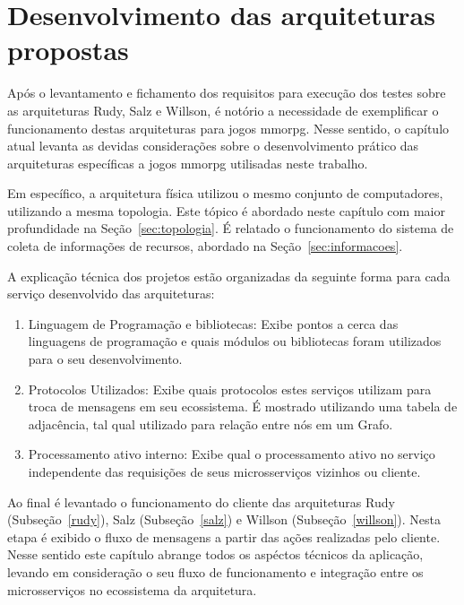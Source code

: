  
\chapter{Desenvolvimento das arquiteturas propostas}
\label{cap5}



Após o levantamento e fichamento dos requisitos para execução dos testes sobre as arquiteturas Rudy, Salz e Willson, é notório a necessidade de exemplificar o funcionamento destas arquiteturas para jogos \ac{mmorpg}.
%
Nesse sentido, o capítulo atual levanta as devidas considerações sobre o desenvolvimento prático das arquiteturas específicas a jogos \ac{mmorpg} utilisadas neste trabalho.


Em específico, a arquitetura física utilizou o mesmo conjunto de computadores, utilizando a mesma topologia.
%
Este tópico é abordado neste capítulo com maior profundidade na Seção~\ref{sec:topologia}.
%
É relatado o funcionamento do sistema de coleta de informações de recursos, abordado na Seção~\ref{sec:informacoes}.

A explicação técnica dos projetos estão organizadas da seguinte forma para cada serviço desenvolvido das arquiteturas:


\begin{enumerate}
    \item Linguagem de Programação e bibliotecas: Exibe pontos a cerca das linguagens de programação e quais módulos ou bibliotecas foram utilizados para o seu desenvolvimento.
    \item Protocolos Utilizados: Exibe quais protocolos estes serviços utilizam para troca de mensagens em seu ecossistema. É mostrado utilizando uma tabela de adjacência, tal qual utilizado para relação entre nós em um Grafo. 
    \item Processamento ativo interno: Exibe qual o processamento ativo no serviço independente das requisições de seus microsserviços vizinhos ou cliente.
\end{enumerate}



Ao final é levantado o funcionamento do cliente das arquiteturas Rudy (Subseção~\ref{rudy}), Salz (Subseção~\ref{salz}) e Willson (Subseção~\ref{willson}).
%
Nesta etapa é exibido o fluxo de mensagens a partir das ações realizadas pelo cliente.
%
Nesse sentido este capítulo abrange todos os aspéctos técnicos da aplicação, levando em consideração o seu fluxo de funcionamento e integração entre os microsserviços no ecossistema da arquitetura.


